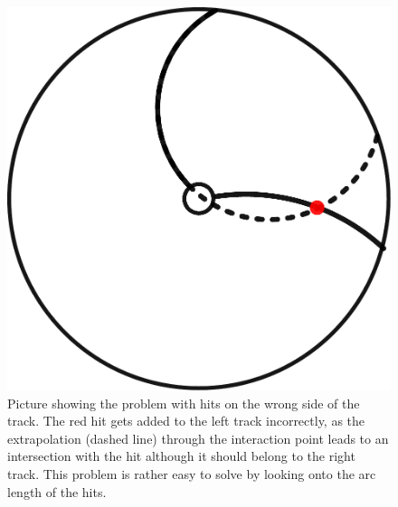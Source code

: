 \begin{figure}
  \centering
  \includegraphics[width=0.48\linewidth]{figures/workflow/B2B.pdf}
  \caption{Picture showing the problem with hits on the wrong side of the track. The red hit gets added to the left track incorrectly, as the extrapolation (dashed line) through the interaction point leads to an intersection with the hit although it should belong to the right track. This problem is rather easy to solve by looking onto the arc length of the hits.}
  \label{fig-b2btrack}
\end{figure}

